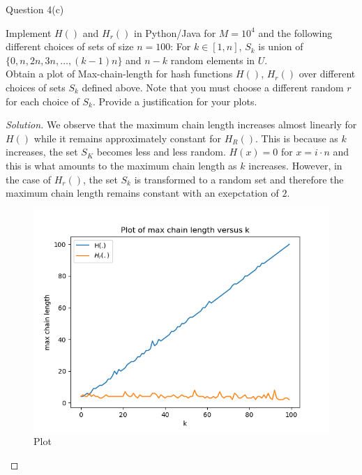 \begin{solution}{Question 4(c)}\label{ques:4c}
    \begin{question}
      Implement $H()$ and $H_r()$ in Python/Java for $M = 10^4$ and the following different choices of sets of size $n = 100$: For $k \in [1, n]$, $S_k$ is union of $\{0, n, 2n, 3n, \ldots, (k-1)n\}$ and $n-k$ random elements in $U$.\\
Obtain a plot of Max-chain-length for hash functions $H()$, $H_r()$ over different choices of sets $S_k$ defined above. Note that you must choose a different random $r$ for each choice of $S_k$. Provide a justification for your plots.
    \end{question}
    \tcblower{}
    \begin{proof}[Solution]
      We observe that the maximum chain length increases almost linearly for $H()$ while it remains approximately constant for $H_R()$. This is because as $k$ increases, the set $S_K$ becomes less and less random. $H(x) = 0$ for $x = i\cdot n$ and this is what amounts to the maximum chain length as $k$ increases. However, in the case of $H_r()$, the set $S_k$ is transformed to a random set and therefore the maximum chain length remains constant with an exepctation of $2$.
      \begin{figure}[H]
        \centering
        \includegraphics[width=0.5\linewidth]{4c.png}
        \caption{Plot}
      \end{figure}
    \end{proof}
\end{solution}
